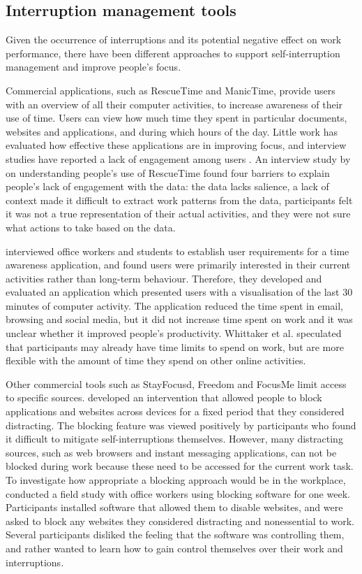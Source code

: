 \subsection{Interruption management tools}
Given the occurrence of interruptions and its potential negative effect on work performance, there have been different approaches to support self-interruption management and improve people's focus. 

Commercial applications, such as RescueTime and ManicTime, provide users with an overview of all their computer activities, to increase awareness of their use of time. Users can view how much time they spent in particular documents, websites and applications, and during which hours of the day. Little work has evaluated how effective these applications are in improving focus, and interview studies have reported a lack of engagement among users \citep{Collins2014, Whittaker2016}. An interview study by \citet{Collins2014} on understanding people’s use of RescueTime found four barriers to explain people’s lack of engagement with the data: the data lacks salience, a lack of context made it difficult to extract work patterns from the data, participants felt it was not a true representation of their actual activities, and they were not sure what actions to take based on the data. 

\citet{Whittaker2016} interviewed office workers and students to establish user requirements for a time awareness application, and found users were primarily interested in their current activities rather than long-term behaviour. Therefore, they developed and evaluated an application which presented users with a visualisation of the last 30 minutes of computer activity. The application reduced the time spent in email, browsing and social media, but it did not increase time spent on work and it was unclear whether it improved people’s productivity. Whittaker et al. speculated that participants may already have time limits to spend on work, but are more flexible with the amount of time they spend on other online activities.

Other commercial tools such as StayFocusd, Freedom and FocusMe limit access to specific sources. \citet{Kim2017} developed an intervention that allowed people to block applications and websites across devices for a fixed period that they considered distracting. The blocking feature was viewed positively by participants who found it difficult to mitigate self-interruptions themselves. However, many distracting sources, such as web browsers and instant messaging applications, can not be blocked during work because these need to be accessed for the current work task. To investigate how appropriate a blocking approach would be in the workplace, \citet{Mark2018} conducted a field study with office workers using blocking software for one week. Participants installed software that allowed them to disable websites, and were asked to block any websites they considered distracting and nonessential to work. Several participants disliked the feeling that the software was controlling them, and rather wanted to learn how to gain control themselves over their work and interruptions.

